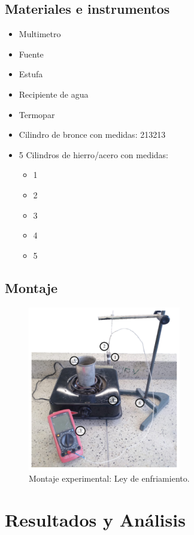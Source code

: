 \documentclass{article}
\begin{document}
\subsection{Materiales e instrumentos}
\begin{itemize}
    \item Multimetro
    \item Fuente 
    \item Estufa
    \item Recipiente de agua
    \item Termopar
    \item Cilindro de bronce con medidas:
        213213
    \item 5 Cilindros de hierro/acero con medidas: 
        \begin{itemize}
        \item 1
        \item 2
        \item 3
        \item 4
        \item 5
        \end{itemize}
\end{itemize}

\subsection{Montaje}
\begin{figure}[H]
    \centering
    \includegraphics{Montaje.png}
    \caption{Montaje experimental: Ley de enfriamiento.}
    
\end{figure}
\section{Resultados y Análisis}
\end{document}
